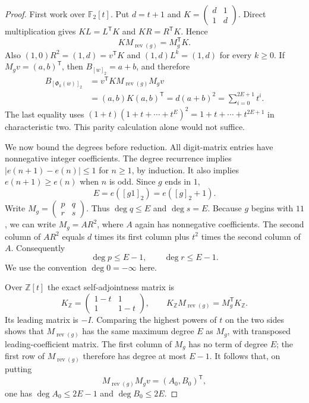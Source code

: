 \documentclass[11pt,a4paper]{article}
\theoremstyle{definition}
\theoremstyle{remark}
\begin{document}
\begin{proof}
First work over $\mathbb F_2[t]$. Put $d=t+1$ and
$K=\left(\begin{smallmatrix}d&1\\1&d\end{smallmatrix}\right)$.
Direct multiplication gives $KL=L^{\mathsf T}K$ and
$KR=R^{\mathsf T}K$. Hence
\[
 KM_{\operatorname{rev}(g)}=M_g^{\mathsf T}K.
\]
Also $(1,0)R^2=(1,d)=v^{\mathsf T}K$ and
$(1,d)L^k=(1,d)$ for every $k\ge0$. If $M_gv=(a,b)^{\mathsf T}$,
then $B_{[w]_2}=a+b$, and therefore
\begin{align*}
 B_{[\Phi_k(w)]_2}
 &=v^{\mathsf T}KM_{\operatorname{rev}(g)}M_gv\\
 &=(a,b)K(a,b)^{\mathsf T}
   =d(a+b)^2
   =\sum_{i=0}^{2E+1}t^i.
\end{align*}
The last equality uses
$(1+t)(1+t+\cdots+t^E)^2=1+t+\cdots+t^{2E+1}$ in
characteristic two. This parity calculation alone would not suffice.

We now bound the degrees before reduction. All digit-matrix entries
have nonnegative integer coefficients. The degree recurrence implies
$|e(n+1)-e(n)|\le1$ for $n\ge1$, by induction. It also implies
$e(n+1)\ge e(n)$ when $n$ is odd. Since $g$ ends in $1$,
\[
 E=e([g1]_2)=e([g]_2+1).
\]
Write $M_g=\left(\begin{smallmatrix}p&q\\r&s\end{smallmatrix}\right)$.
Thus $\deg q\le E$ and $\deg s=E$. Because $g$ begins with $11$,
we can write $M_g=A R^2$, where $A$ again has nonnegative coefficients.
The second column of $AR^2$ equals $d$ times its first column plus
$t^2$ times the second column of $A$. Consequently
\[
 \deg p\le E-1,\qquad \deg r\le E-1.
\]
We use the convention $\deg0=-\infty$ here.

Over $\mathbb Z[t]$ the exact self-adjointness matrix is
\[
 K_{\mathbb Z}=\begin{pmatrix}1-t&1\\1&1-t\end{pmatrix},
 \qquad
 K_{\mathbb Z}M_{\operatorname{rev}(g)}=M_g^{\mathsf T}K_{\mathbb Z}.
\]
Its leading matrix is $-I$. Comparing the highest powers of $t$ on
the two sides shows that $M_{\operatorname{rev}(g)}$ has the same
maximum degree $E$ as $M_g$, with transposed leading-coefficient
matrix. The first column of $M_g$ has no term of degree $E$;
the first row of $M_{\operatorname{rev}(g)}$ therefore has degree
at most $E-1$. It follows that, on putting
\[
 M_{\operatorname{rev}(g)}M_gv=(A_0,B_0)^{\mathsf T},
\]
one has $\deg A_0\le2E-1$ and $\deg B_0\le2E$.


\end{proof}
\end{document}
